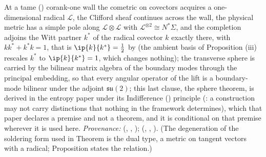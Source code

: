 At a tame () corank-one wall the cometric on covectors acquires a one-dimensional radical $\mathcal{L}$, the Clifford sheaf continues across the wall, the physical metric has a simple pole along $\mathcal{L}\otimes\mathcal{L}$ with $\mathcal{L}^{\otimes 2} \cong N^*\Sigma$, and the completion adjoins the Witt partner $k^*$ of the radical covector $k$ exactly there, with $kk^* + k^*k = 1$, that is $\ip{k}{k^*} = \tfrac12$ by  (the ambient basis of Proposition (iii) rescales $k^*$ to $\ip{k}{k^*} = 1$, which changes nothing); the transverse sphere is carried by the bilinear matrix algebra of the boundary modes through the principal embedding, so that every angular operator of the lift is a boundary-mode bilinear under the adjoint $\mathfrak{su}(2)$; this last clause, the sphere theorem, is derived in the entropy paper under its Indifference () principle (\cite[Principle~5.4]{ButlerT8}: a construction may not carry distinctions that nothing in the framework determines), which that paper declares a premise and not a theorem, and it is conditional on that premise wherever it is used here. \emph{Provenance:} \cite[Thm.~3.1, Cor.~4.5, Thm.~6.2]{ButlerT4} (, , ); \cite[Prop.~5.2, Principle~5.4, Thm.~5.5, Prop.~5.6]{ButlerT8} (, , ). (The degeneration of the soldering form used in Theorem  is the dual type, a metric on tangent vectors with a radical; Proposition  states the relation.)
